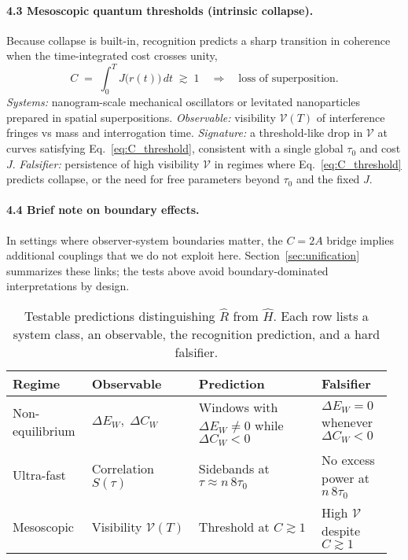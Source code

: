 \documentclass[aps,prx,twocolumn,superscriptaddress,nofootinbib]{revtex4-2}
\newcommand{\Rhat}{\hat{R}}
\newcommand{\Hhat}{\hat{H}}
\newcommand{\Jcost}{J}
\newcommand{\Ccost}{C}
\newcommand{\TauZero}{\tau_{0}}
\begin{document}
\paragraph*{4.3 Mesoscopic quantum thresholds (intrinsic collapse).} Because collapse is built-in, recognition predicts a sharp transition in coherence when the time-integrated cost crosses unity,
\begin{equation}\label{eq:C_threshold}
  \Ccost\;=\;\int_{0}^{T}\!\Jcost\bigl(r(t)\bigr)\,dt\;\gtrsim\;1\quad\Longrightarrow\quad \text{loss of superposition.}
\end{equation}
\emph{Systems:} nanogram-scale mechanical oscillators or levitated nanoparticles prepared in spatial superpositions. \emph{Observable:} visibility \(\mathcal{V}(T)\) of interference fringes vs mass and interrogation time. \emph{Signature:} a threshold-like drop in \(\mathcal{V}\) at curves satisfying Eq.~\eqref{eq:C_threshold}, consistent with a single global \(\TauZero\) and cost \(\Jcost\). \emph{Falsifier:} persistence of high visibility \(\mathcal{V}\) in regimes where Eq.~\eqref{eq:C_threshold} predicts collapse, or the need for free parameters beyond \(\TauZero\) and the fixed \(\Jcost\).

\paragraph*{4.4 Brief note on boundary effects.} In settings where observer-system boundaries matter, the \(\Ccost=2A\) bridge implies additional couplings that we do not exploit here. Section~\ref{sec:unification} summarizes these links; the tests above avoid boundary-dominated interpretations by design.

\begin{table}[t]
  \caption{Testable predictions distinguishing \(\Rhat\) from \(\Hhat\). Each row lists a system class, an observable, the recognition prediction, and a hard falsifier.}
  \label{tab:predictions}
  \centering
  \begin{tabular}{p{0.20\linewidth}p{0.27\linewidth}p{0.31\linewidth}p{0.18\linewidth}}
    \hline
    Regime & Observable & Prediction & Falsifier \\
    \hline
    Non-equilibrium & \(\Delta E_W,\;\Delta\Ccost_W\) & Windows with \(\Delta E_W\neq 0\) while \(\Delta\Ccost_W<0\) & \(\Delta E_W=0\) whenever \(\Delta\Ccost_W<0\) \\
    Ultra-fast & Correlation \(S(\tau)\) & Sidebands at \(\tau\approx n\,8\TauZero\) & No excess power at \(n\,8\TauZero\) \\
    Mesoscopic & Visibility \(\mathcal{V}(T)\) & Threshold at \(\Ccost\gtrsim 1\) & High \(\mathcal{V}\) despite \(\Ccost\gtrsim 1\) \\
    \hline
  \end{tabular}
\end{table}
\end{document}

